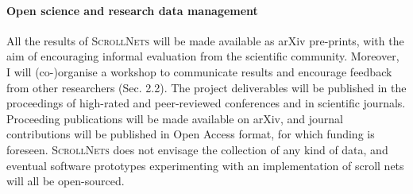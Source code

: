 \documentclass[12pt,draftproposal]{msca-pf}
\newcommand{\proj}{\small\textsc{ScrollNets}}
\begin{document}
\paragraph{Open science and research data management}
All the results of {\proj} will be made available as arXiv pre-prints, with the aim of encouraging
informal evaluation from the scientific community. Moreover, I will (co-)organise a workshop to
communicate results and encourage feedback from other researchers (Sec. 2.2). The project
deliverables will be published in the proceedings of high-rated and peer-reviewed conferences and in
scientific journals. Proceeding publications will be made available on arXiv, and journal
contributions will be published in Open Access format, for which funding is foreseen. {\proj} does
not envisage the collection of any kind of data, and eventual software prototypes experimenting with
an implementation of scroll nets will all be open-sourced.





\end{document}
